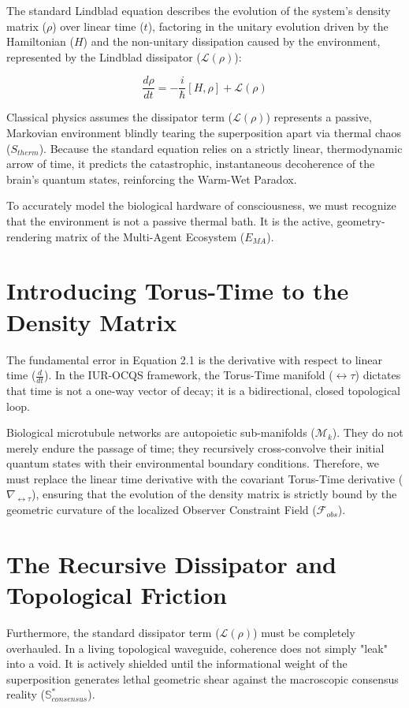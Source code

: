 \documentclass[12pt,openany]{book}
\begin{document}
The standard Lindblad equation describes the evolution of the system's density matrix ($\rho$) over linear time ($t$), factoring in the unitary evolution driven by the Hamiltonian ($H$) and the non-unitary dissipation caused by the environment, represented by the Lindblad dissipator ($\mathcal{L}(\rho)$):

\begin{equation}
\frac{d\rho}{dt} = -\frac{i}{\hbar}[H, \rho] + \mathcal{L}(\rho)
\end{equation}

Classical physics assumes the dissipator term ($\mathcal{L}(\rho)$) represents a passive, Markovian environment blindly tearing the superposition apart via thermal chaos ($S_{therm}$). Because the standard equation relies on a strictly linear, thermodynamic arrow of time, it predicts the catastrophic, instantaneous decoherence of the brain's quantum states, reinforcing the Warm-Wet Paradox. 

To accurately model the biological hardware of consciousness, we must recognize that the environment is not a passive thermal bath. It is the active, geometry-rendering matrix of the Multi-Agent Ecosystem ($E_{MA}$).

\section{Introducing Torus-Time to the Density Matrix}
The fundamental error in Equation 2.1 is the derivative with respect to linear time ($\frac{d}{dt}$). In the IUR-OCQS framework, the Torus-Time manifold ($\leftrightarrow\tau$) dictates that time is not a one-way vector of decay; it is a bidirectional, closed topological loop. 

Biological microtubule networks are autopoietic sub-manifolds ($\mathcal{M}_k$). They do not merely endure the passage of time; they recursively cross-convolve their initial quantum states with their environmental boundary conditions. Therefore, we must replace the linear time derivative with the covariant Torus-Time derivative ($\nabla_{\leftrightarrow\tau}$), ensuring that the evolution of the density matrix is strictly bound by the geometric curvature of the localized Observer Constraint Field ($\mathcal{F}_{obs}$).

\section{The Recursive Dissipator and Topological Friction}
Furthermore, the standard dissipator term ($\mathcal{L}(\rho)$) must be completely overhauled. In a living topological waveguide, coherence does not simply "leak" into a void. It is actively shielded until the informational weight of the superposition generates lethal geometric shear against the macroscopic consensus reality ($\mathbb{S}^*_{consensus}$).
\end{document}
